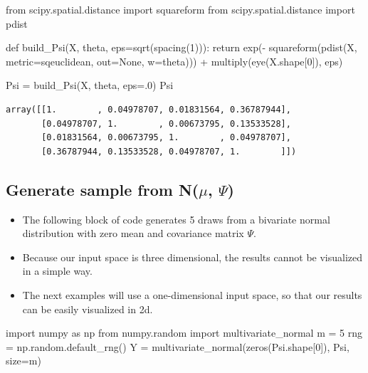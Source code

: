 \documentclass[
  letterpaper,
  DIV=11,
  numbers=noendperiod]{scrreprt}
\newenvironment{Shaded}{\begin{snugshade}}{\end{snugshade}}
\newcommand{\ControlFlowTok}[1]{\textcolor[rgb]{0.00,0.23,0.31}{#1}}
\newcommand{\DecValTok}[1]{\textcolor[rgb]{0.68,0.00,0.00}{#1}}
\newcommand{\FloatTok}[1]{\textcolor[rgb]{0.68,0.00,0.00}{#1}}
\newcommand{\ImportTok}[1]{\textcolor[rgb]{0.00,0.46,0.62}{#1}}
\newcommand{\KeywordTok}[1]{\textcolor[rgb]{0.00,0.23,0.31}{#1}}
\newcommand{\NormalTok}[1]{\textcolor[rgb]{0.00,0.23,0.31}{#1}}
\newcommand{\OperatorTok}[1]{\textcolor[rgb]{0.37,0.37,0.37}{#1}}
\newcommand{\StringTok}[1]{\textcolor[rgb]{0.13,0.47,0.30}{#1}}
\newcommand{\VariableTok}[1]{\textcolor[rgb]{0.07,0.07,0.07}{#1}}
\providecommand{\tightlist}{%
  \setlength{\itemsep}{0pt}\setlength{\parskip}{0pt}}\usepackage{longtable,booktabs,array}
\begin{document}
\begin{Shaded}
\begin{Highlighting}[]
\ImportTok{from}\NormalTok{ scipy.spatial.distance }\ImportTok{import}\NormalTok{ squareform}
\ImportTok{from}\NormalTok{ scipy.spatial.distance }\ImportTok{import}\NormalTok{ pdist}

\KeywordTok{def}\NormalTok{ build\_Psi(X, theta, eps}\OperatorTok{=}\NormalTok{sqrt(spacing(}\DecValTok{1}\NormalTok{))):}
    \ControlFlowTok{return}\NormalTok{ exp(}\OperatorTok{{-}}\NormalTok{ squareform(pdist(X, metric}\OperatorTok{=}\StringTok{\textquotesingle{}sqeuclidean\textquotesingle{}}\NormalTok{, out}\OperatorTok{=}\VariableTok{None}\NormalTok{, w}\OperatorTok{=}\NormalTok{theta))) }\OperatorTok{+}\NormalTok{  multiply(eye(X.shape[}\DecValTok{0}\NormalTok{]), eps)}

\NormalTok{Psi }\OperatorTok{=}\NormalTok{ build\_Psi(X, theta, eps}\OperatorTok{=}\FloatTok{.0}\NormalTok{)}
\NormalTok{Psi}
\end{Highlighting}
\end{Shaded}

\begin{verbatim}
array([[1.        , 0.04978707, 0.01831564, 0.36787944],
       [0.04978707, 1.        , 0.00673795, 0.13533528],
       [0.01831564, 0.00673795, 1.        , 0.04978707],
       [0.36787944, 0.13533528, 0.04978707, 1.        ]])
\end{verbatim}

\hypertarget{generate-sample-from-nmu-psi}{%
\subsection{\texorpdfstring{Generate sample from N(\(\mu\),
\(\Psi\))}{Generate sample from N(\textbackslash mu, \textbackslash Psi)}}\label{generate-sample-from-nmu-psi}}

\begin{itemize}
\tightlist
\item
  The following block of code generates 5 draws from a bivariate normal
  distribution with zero mean and covariance matrix \(\Psi\).
\item
  Because our input space is three dimensional, the results cannot be
  visualized in a simple way.
\item
  The next examples will use a one-dimensional input space, so that our
  results can be easily visualized in 2d.
\end{itemize}

\begin{Shaded}
\begin{Highlighting}[]
\ImportTok{import}\NormalTok{ numpy }\ImportTok{as}\NormalTok{ np}
\ImportTok{from}\NormalTok{ numpy.random }\ImportTok{import}\NormalTok{ multivariate\_normal}
\NormalTok{m }\OperatorTok{=} \DecValTok{5}
\NormalTok{rng }\OperatorTok{=}\NormalTok{ np.random.default\_rng()}
\NormalTok{Y }\OperatorTok{=}\NormalTok{ multivariate\_normal(zeros(Psi.shape[}\DecValTok{0}\NormalTok{]), Psi, size}\OperatorTok{=}\NormalTok{m)}
\end{Highlighting}
\end{Shaded}
\end{document}
